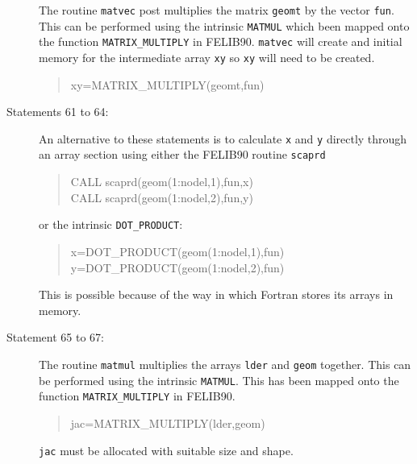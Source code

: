 \begin{description}
The routine {\tt matvec} post multiplies the matrix {\tt geomt}
by the vector {\tt fun}. This can be performed using the intrinsic {\tt MATMUL} 
which been mapped onto the function  {\tt MATRIX\_MULTIPLY} in FELIB90. {\tt matvec}
will create and initial memory for the intermediate array {\tt xy} so {\tt xy}
will need to be created.
\begin{quote}
\source
xy=MATRIX\_MULTIPLY(geomt,fun)
\end{quote}
\item[Statements 61 to 64:] An alternative to these statements is to 
calculate {\tt x} and {\tt y} directly through an array section 
using either the FELIB90 routine {\tt scaprd}
\begin{quote}
\source
CALL scaprd(geom(1:nodel,1),fun,x)\\
CALL scaprd(geom(1:nodel,2),fun,y)
\end{quote}
or the intrinsic {\tt DOT\_PRODUCT}:
\begin{quote}
\source
x=DOT\_PRODUCT(geom(1:nodel,1),fun)\\
y=DOT\_PRODUCT(geom(1:nodel,2),fun)
\end{quote}
This is possible because of the way in which Fortran stores its arrays in memory.
\item[Statement 65 to 67:] The routine {\tt matmul} multiplies the arrays {\tt lder}
and {\tt geom} together. This can be performed using the
intrinsic {\tt MATMUL}. This has been mapped onto the function {\tt MATRIX\_MULTIPLY}
in FELIB90.
\begin{quote}
\source
jac=MATRIX\_MULTIPLY(lder,geom)
\end{quote}
{\tt jac} must be allocated with suitable size and shape.


\end{description}
